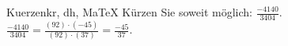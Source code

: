 \begin{MAufgabe}{Kuerzen}{kr, dh, MaTeX}
K\"urzen Sie soweit m\"oglich: $\frac{-4140}{3404}$.\\ 
\ifLsg\MLoesung
\quad $\frac{-4140}{3404}=\frac{(92)\cdot(-45)}{(92)\cdot(37)}=\frac{-45}{37}$.\else\relax\fi
 \end{MAufgabe}